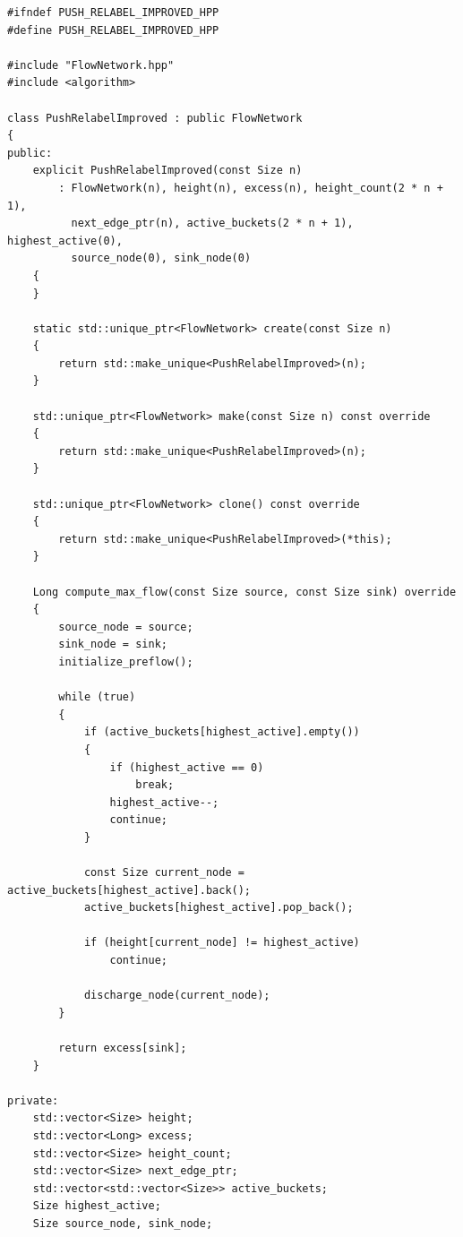 \newpage
\label{ap:push_relabel_improved}

\begin{lstlisting}[caption={Implementação em C++ da classe \lstinline{PushRelabelImproved}, otimizada empiricamente com a Heurística de Lacuna (\textit{Gap Heuristic}).}, label={lst:push_relabel_improved}]
#ifndef PUSH_RELABEL_IMPROVED_HPP
#define PUSH_RELABEL_IMPROVED_HPP

#include "FlowNetwork.hpp"
#include <algorithm>

class PushRelabelImproved : public FlowNetwork
{
public:
	explicit PushRelabelImproved(const Size n)
	    : FlowNetwork(n), height(n), excess(n), height_count(2 * n + 1),
	      next_edge_ptr(n), active_buckets(2 * n + 1), highest_active(0),
	      source_node(0), sink_node(0)
	{
	}

	static std::unique_ptr<FlowNetwork> create(const Size n)
	{
		return std::make_unique<PushRelabelImproved>(n);
	}

	std::unique_ptr<FlowNetwork> make(const Size n) const override
	{
		return std::make_unique<PushRelabelImproved>(n);
	}

	std::unique_ptr<FlowNetwork> clone() const override
	{
		return std::make_unique<PushRelabelImproved>(*this);
	}

	Long compute_max_flow(const Size source, const Size sink) override
	{
		source_node = source;
		sink_node = sink;
		initialize_preflow();

		while (true)
		{
			if (active_buckets[highest_active].empty())
			{
				if (highest_active == 0)
					break;
				highest_active--;
				continue;
			}

			const Size current_node = active_buckets[highest_active].back();
			active_buckets[highest_active].pop_back();

			if (height[current_node] != highest_active)
				continue;

			discharge_node(current_node);
		}

		return excess[sink];
	}

private:
	std::vector<Size> height;
	std::vector<Long> excess;
	std::vector<Size> height_count;
	std::vector<Size> next_edge_ptr;
	std::vector<std::vector<Size>> active_buckets;
	Size highest_active;
	Size source_node, sink_node;


\end{lstlisting}
